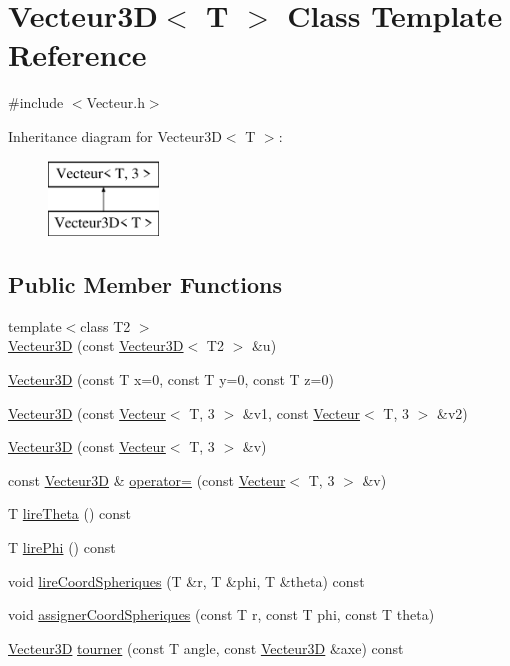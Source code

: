 \hypertarget{class_vecteur3_d}{\section{Vecteur3\-D$<$ T $>$ Class Template Reference}
\label{class_vecteur3_d}
}


{\ttfamily \#include $<$Vecteur.\-h$>$}

Inheritance diagram for Vecteur3\-D$<$ T $>$\-:\begin{figure}[H]
\begin{center}
\leavevmode
\includegraphics[height=2.000000cm]{class_vecteur3_d}
\end{center}
\end{figure}
\subsection*{Public Member Functions}
\begin{DoxyCompactItemize}
\item 
{\footnotesize template$<$class T2 $>$ }\\\hyperlink{class_vecteur3_d_a4e440b6497113a0898d55d9ef8b6fe98}{Vecteur3\-D} (const \hyperlink{class_vecteur3_d}{Vecteur3\-D}$<$ T2 $>$ \&u)
\item 
\hyperlink{class_vecteur3_d_a3dac3fef39e0de25b9cf4105ea4f54c1}{Vecteur3\-D} (const T x=0, const T y=0, const T z=0)
\item 
\hyperlink{class_vecteur3_d_aee3fa82fca12f7c5716617997e0a07b4}{Vecteur3\-D} (const \hyperlink{class_vecteur}{Vecteur}$<$ T, 3 $>$ \&v1, const \hyperlink{class_vecteur}{Vecteur}$<$ T, 3 $>$ \&v2)
\item 
\hyperlink{class_vecteur3_d_a6f4a132eaeff0688956279fd4c194908}{Vecteur3\-D} (const \hyperlink{class_vecteur}{Vecteur}$<$ T, 3 $>$ \&v)
\item 
const \hyperlink{class_vecteur3_d}{Vecteur3\-D} \& \hyperlink{class_vecteur3_d_ae71f89b1a7176fd7c9703c7e26c8d50d}{operator=} (const \hyperlink{class_vecteur}{Vecteur}$<$ T, 3 $>$ \&v)
\item 
T \hyperlink{class_vecteur3_d_abad73b19714098f545f6dd4260f0e479}{lire\-Theta} () const 
\item 
T \hyperlink{class_vecteur3_d_addb40be5e1fef2ac222282a9a8653a1d}{lire\-Phi} () const 
\item 
void \hyperlink{class_vecteur3_d_aaca3efa6e3de652ae9a5b0d068217daf}{lire\-Coord\-Spheriques} (T \&r, T \&phi, T \&theta) const 
\item 
void \hyperlink{class_vecteur3_d_a7ebfed587f8295fa90dded603ffd9495}{assigner\-Coord\-Spheriques} (const T r, const T phi, const T theta)
\item 
\hyperlink{class_vecteur3_d}{Vecteur3\-D} \hyperlink{class_vecteur3_d_a5026a41f03a1b0a31158b9a29ef27177}{tourner} (const T angle, const \hyperlink{class_vecteur3_d}{Vecteur3\-D} \&axe) const 
\end{DoxyCompactItemize}
